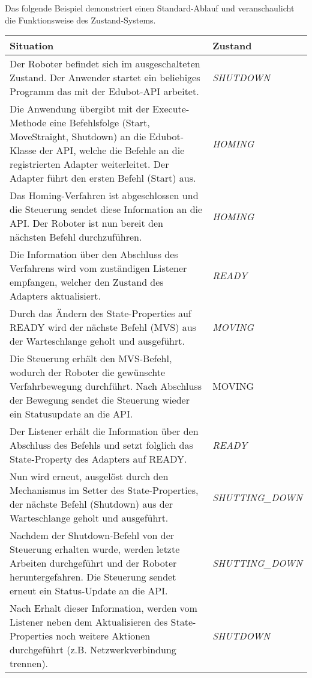 \newpage
Das folgende Beispiel demonstriert einen Standard-Ablauf und veranschaulicht die Funktionsweise des Zustand-Systems.
\newline
\newline
\begin{tabular}{|p{10cm}|p{4cm}|}
\hline \rowcolor{lightgray} \hline
\textbf{Situation} & \textbf{Zustand}\\
\hline
Der Roboter befindet sich im ausgeschalteten Zustand. Der Anwender startet ein beliebiges Programm das mit der Edubot-API arbeitet. & \textit{SHUTDOWN}\\
\hline
Die Anwendung übergibt mit der Execute-Methode eine Befehlsfolge (Start, MoveStraight, Shutdown) an die Edubot-Klasse der API, welche die Befehle an die registrierten Adapter weiterleitet. Der Adapter führt den ersten Befehl (Start) aus. & \textit{HOMING}\\
\hline
Das Homing-Verfahren ist abgeschlossen und die Steuerung sendet diese Information an die API. Der Roboter ist nun bereit den nächsten Befehl durchzuführen. & \textit{HOMING}\\
\hline
Die Information über den Abschluss des Verfahrens wird vom zuständigen Listener empfangen, welcher den Zustand des Adapters aktualisiert. & \textit{READY}\\
\hline
Durch das Ändern des State-Properties auf READY wird der nächste Befehl (MVS) aus der Warteschlange geholt und ausgeführt. & \textit{MOVING}\\
\hline
Die Steuerung erhält den MVS-Befehl, wodurch der Roboter die gewünschte Verfahrbewegung durchführt. Nach Abschluss der Bewegung sendet die Steuerung wieder ein Statusupdate an die API.	 & MOVING\\
\hline
Der Listener erhält die Information über den Abschluss des Befehls und setzt folglich das State-Property des Adapters auf READY. & \textit{READY}\\
\hline
Nun wird erneut, ausgelöst durch den Mechanismus im Setter des State-Properties, der nächste Befehl (Shutdown) aus der Warteschlange geholt und ausgeführt. & \textit{SHUTTING\_DOWN}\\
\hline
Nachdem der Shutdown-Befehl von der Steuerung erhalten wurde, werden letzte Arbeiten durchgeführt und der Roboter heruntergefahren. Die Steuerung sendet erneut ein Status-Update an die API. & \textit{SHUTTING\_DOWN}\\
\hline
Nach Erhalt dieser Information, werden vom Listener neben dem Aktualisieren des State-Properties noch weitere Aktionen durchgeführt (z.B. Netzwerkverbindung trennen). & \textit{SHUTDOWN}\\
\hline
\end{tabular}